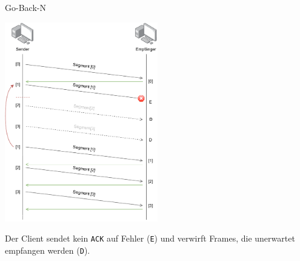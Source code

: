 \begin{example}{Go-Back-N}
    \begin{center}
        \includegraphics[width=0.5\textwidth]{includes/figures/example_go_back_n.pdf}
    \end{center}

    Der Client sendet kein \texttt{ACK} auf Fehler (\texttt{E}) und verwirft Frames, die unerwartet empfangen werden (\texttt{D}).
\end{example}